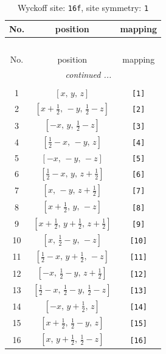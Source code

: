 \documentclass[fleqn,8pt]{jsarticle}
\begin{document}
\begin{longtable}{ccc}
\caption{Wyckoff site: {\tt 16f}, site symmetry: {\tt 1}}
 \\
 \hline \hline
No. & position & mapping \\ \hline \endfirsthead

\multicolumn{2}{l}{\tablename\ \thetable{}} \\
 \hline \hline
No. & position & mapping \\ \hline \endhead

 \hline \hline
\multicolumn{2}{r}{\footnotesize\it continued ...} \\ \endfoot

 \hline \hline
\multicolumn{2}{r}{} \\ \endlastfoot

1 & $\left[ x,\, y,\, z \right]$ & {\tt [1]} \\ \hline
2 & $\left[ x + \frac{1}{2},\, - y,\, \frac{1}{2} - z \right]$ & {\tt [2]} \\ \hline
3 & $\left[ - x,\, y,\, \frac{1}{2} - z \right]$ & {\tt [3]} \\ \hline
4 & $\left[ \frac{1}{2} - x,\, - y,\, z \right]$ & {\tt [4]} \\ \hline
5 & $\left[ - x,\, - y,\, - z \right]$ & {\tt [5]} \\ \hline
6 & $\left[ \frac{1}{2} - x,\, y,\, z + \frac{1}{2} \right]$ & {\tt [6]} \\ \hline
7 & $\left[ x,\, - y,\, z + \frac{1}{2} \right]$ & {\tt [7]} \\ \hline
8 & $\left[ x + \frac{1}{2},\, y,\, - z \right]$ & {\tt [8]} \\ \hline
9 & $\left[ x + \frac{1}{2},\, y + \frac{1}{2},\, z + \frac{1}{2} \right]$ & {\tt [9]} \\ \hline
10 & $\left[ x,\, \frac{1}{2} - y,\, - z \right]$ & {\tt [10]} \\ \hline
11 & $\left[ \frac{1}{2} - x,\, y + \frac{1}{2},\, - z \right]$ & {\tt [11]} \\ \hline
12 & $\left[ - x,\, \frac{1}{2} - y,\, z + \frac{1}{2} \right]$ & {\tt [12]} \\ \hline
13 & $\left[ \frac{1}{2} - x,\, \frac{1}{2} - y,\, \frac{1}{2} - z \right]$ & {\tt [13]} \\ \hline
14 & $\left[ - x,\, y + \frac{1}{2},\, z \right]$ & {\tt [14]} \\ \hline
15 & $\left[ x + \frac{1}{2},\, \frac{1}{2} - y,\, z \right]$ & {\tt [15]} \\ \hline
16 & $\left[ x,\, y + \frac{1}{2},\, \frac{1}{2} - z \right]$ & {\tt [16]} \\
\end{longtable}
\end{document}
